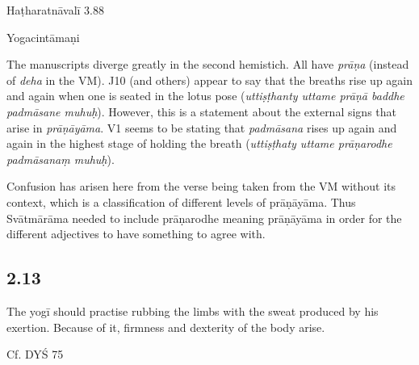 \begin{ekdosis}
\begin{testimonia}[hp02_012]
Haṭharatnāvalī 3.88

\begin{versinnote}
\end{versinnote}

Yogacintāmaṇi

\begin{versinnote}
\end{versinnote}
\end{testimonia}

\begin{philcomm}[hp02_012]
The manuscripts diverge greatly in the second hemistich. All have \emph{prāṇa} (instead of \emph{deha} in the VM). J10 (and others) appear to say that the breaths rise up again and again when one is seated in the lotus pose (\emph{uttiṣṭhanty uttame prāṇā baddhe padmāsane muhuḥ}). However, this is a statement about the external signs that arise in \emph{prāṇāyāma}. V1 seems to be stating that \emph{padmāsana} rises up again and again in the highest stage of holding the breath (\emph{uttiṣṭhaty uttame prāṇarodhe padmāsanaṃ muhuḥ}).

Confusion has arisen here from the verse being taken from the VM without its context, which is a classification of different levels of prāṇāyāma. Thus Svātmārāma needed to include prāṇarodhe meaning prāṇāyāma in order for the different adjectives to have something to agree with.
\end{philcomm}

\subsection*{2.13}
\begin{translation}[hp02_013]
The yogī should practise rubbing the limbs with the sweat produced by his exertion. Because of it, firmness and dexterity of the body arise.
\end{translation}

\begin{sources}[hp02_013]
Cf. DYŚ 75

\begin{versinnote}
\end{versinnote}
\end{sources}


\end{ekdosis}
